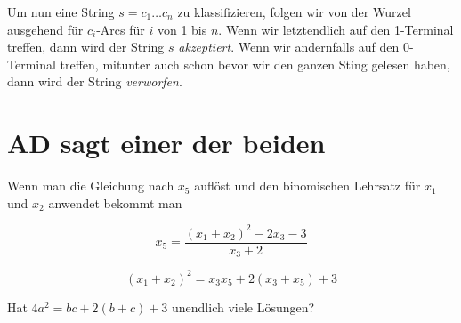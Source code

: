 \documentclass[../main.tex]{subfiles}
\begin{document}
Um nun eine String $s = c_1 \hdots c_n$ zu klassifizieren, folgen wir von der Wurzel ausgehend für $c_i$-Arcs für $i$ von 1 bis $n$. Wenn wir letztendlich auf den 1-Terminal treffen, dann wird der String $s$ \emph{akzeptiert}. Wenn wir andernfalls auf den 0-Terminal treffen, mitunter auch schon bevor wir den ganzen Sting gelesen haben, dann wird der String \emph{verworfen}.


































\iffalse
\chapter*{AD sagt einer der beiden}

Wenn man die Gleichung nach $x_5$ auflöst und den binomischen Lehrsatz für $x_1$ und $x_2$ anwendet bekommt man

\begin{equation*}
    x_5 = \frac{(x_1 + x_2)^2 - 2x_3 - 3}{x_3+2}
\end{equation*}

\begin{equation}
    (x_1 + x_2)^2 = x_3x_5 + 2(x_3 + x_5) + 3
\end{equation}

Hat $4a^2 = bc + 2(b+c) + 3$ unendlich viele Lösungen?
\end{document}
